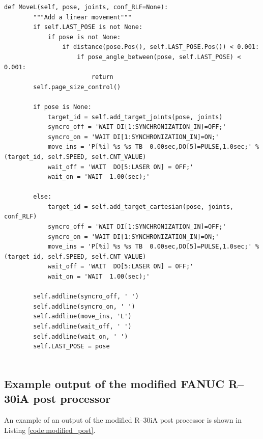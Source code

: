 \begin{lstlisting}[numbers=none,caption={Code snippet of modified MoveL method},captionpos=b,label={code:modifiedMoveL}]
    def MoveL(self, pose, joints, conf_RLF=None):
        """Add a linear movement"""
        if self.LAST_POSE is not None:
            if pose is not None:
                if distance(pose.Pos(), self.LAST_POSE.Pos()) < 0.001:
                    if pose_angle_between(pose, self.LAST_POSE) < 0.001:
                        return
        self.page_size_control()
        
        if pose is None:
            target_id = self.add_target_joints(pose, joints)
            syncro_off = 'WAIT DI[1:SYNCHRONIZATION_IN]=OFF;'
            syncro_on = 'WAIT DI[1:SYNCHRONIZATION_IN]=ON;'
            move_ins = 'P[%i] %s %s TB  0.00sec,DO[5]=PULSE,1.0sec;' % (target_id, self.SPEED, self.CNT_VALUE)
            wait_off = 'WAIT  DO[5:LASER ON] = OFF;'
            wait_on = 'WAIT  1.00(sec);'
            
        else:
            target_id = self.add_target_cartesian(pose, joints, conf_RLF)
            syncro_off = 'WAIT DI[1:SYNCHRONIZATION_IN]=OFF;'
            syncro_on = 'WAIT DI[1:SYNCHRONIZATION_IN]=ON;'
            move_ins = 'P[%i] %s %s TB  0.00sec,DO[5]=PULSE,1.0sec;' % (target_id, self.SPEED, self.CNT_VALUE)
            wait_off = 'WAIT  DO[5:LASER ON] = OFF;'
            wait_on = 'WAIT  1.00(sec);'
            
        self.addline(syncro_off, ' ')
        self.addline(syncro_on, ' ')
        self.addline(move_ins, 'L')
        self.addline(wait_off, ' ')
        self.addline(wait_on, ' ')
        self.LAST_POSE = pose


\end{lstlisting}



\subsection{Example output of the modified FANUC R--30iA post processor} 
\label{sec:example}

An example of an output of the modified R--30iA post processor is shown in Listing \ref{code:modified_post}.


